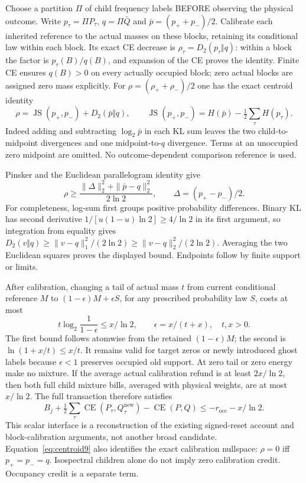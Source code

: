 \documentclass[11pt]{article}
\newcommand{\KL}{D_2}
\newcommand{\CE}{\operatorname{CE}}
\begin{document}
Choose a partition $\Pi$ of child frequency labels BEFORE observing
the physical outcome. Write $p_\tau=\Pi P_\tau$, $q=\Pi\bar Q$ and
$\bar p=(p_++p_-)/2$. Calibrate each inherited reference to the
actual masses on these blocks, retaining its conditional law within
each block. Its exact CE decrease is
$\rho_\tau=\KL(p_\tau\Vert q)$: within a block the factor is
$p_\tau(B)/q(B)$, and expansion of the CE proves the identity.
Finite CE ensures $q(B)>0$ on every actually occupied block;
zero actual blocks are assigned zero mass explicitly.
For $\rho=(\rho_++\rho_-)/2$ one has the exact centroid identity
\[
\rho=\operatorname{JS}(p_+,p_-)+\KL(\bar p\Vert q),\qquad
\operatorname{JS}(p_+,p_-)=H(\bar p)-\tfrac12\sum_\tau H(p_\tau).
\tag{PC9}\label{eq:centroid9}
\]
Indeed adding and subtracting $\log_2\bar p$ in each KL sum
leaves the two child-to-midpoint divergences and one midpoint-to-$q$
divergence. Terms at an unoccupied zero midpoint are omitted.
No outcome-dependent comparison reference is used.

Pinsker and the Euclidean parallelogram identity give
\[
\rho\ge\frac{\|\Delta\|_2^2+\|\bar p-q\|_2^2}{2\ln2},
\qquad\Delta=(p_+-p_-)/2.
\tag{PP9}\label{eq:euclid9}
\]
For completeness, log-sum first groups positive probability
differences. Binary KL has second derivative
$1/[u(1-u)\ln2]\ge4/\ln2$ in its first argument, so integration
from equality gives $\KL(v\Vert q)\ge\|v-q\|_1^2/(2\ln2)
\ge\|v-q\|_2^2/(2\ln2)$. Averaging the two Euclidean squares
proves the displayed bound. Endpoints follow by finite support or limits.

After calibration, changing a tail of actual mass $t$ from current
conditional reference $M$ to $(1-\epsilon)M+\epsilon S$, for any
prescribed probability law $S$, costs at most
\[
t\log_2\frac1{1-\epsilon}\le x/\ln2,
\qquad\epsilon=x/(t+x),\quad t,x>0.
\tag{PM9}\label{eq:mixture9}
\]
The first bound follows atomwise from the retained $(1-\epsilon)M$;
the second is $\ln(1+x/t)\le x/t$. It remains valid for target zeros
or newly introduced ghost labels because $\epsilon<1$ preserves
occupied old support. At zero tail or zero energy make no mixture.
If the average actual calibration refund is at least $2x/\ln2$,
then both full child mixture bills, averaged with physical weights,
are at most $x/\ln2$. The full transaction therefore satisfies
\[
B_j+\tfrac12\sum_\tau\CE(P_\tau,Q^{\mathrm{new}}_\tau)
-\CE(P,Q)\le-r_{\mathrm{occ}}-x/\ln2.
\tag{PT9}\label{eq:payment9}
\]
This scalar interface is a reconstruction of the existing signed-reset
account and block-calibration arguments, not another broad candidate.
Equation~\eqref{eq:centroid9} also identifies the exact calibration
nullspace: $\rho=0$ iff $p_+=p_-=q$. Isospectral children alone do
not imply zero calibration credit. Occupancy credit is a separate term.
\end{document}
